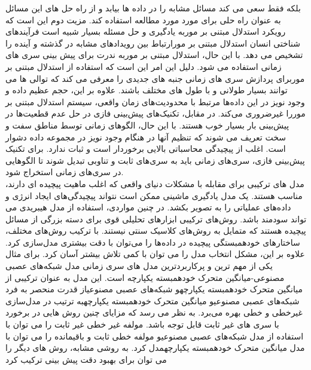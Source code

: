   بلکه فقط سعی می کند مسائل مشابه را در داده ها بیابد 
 و از راه حل های این مسائل
  به عنوان راه حلی برای مورد مورد مطالعه استفاده کند. 
 مزیت دوم این است که رویکرد استدلال مبتنی بر مور\footnotemark[7] به یادگیری و حل مسئله بسیار شبیه است
فرآیندهای شناختی انسان استدلال مبتنی بر مور\footnotemark[7] ارتباط بین رویدادهای مشابه در گذشته و آینده را تشخیص می دهد. با این حال، استدلال مبتنی بر مور\footnotemark[7] به ندرت برای پیش بینی سری های زمانی استفاده می شود.
 دلیل این امر این است که استفاده از استدلال مبتنی بر مور\footnotemark[7] برای پردازش سری های زمانی جنبه های جدیدی را معرفی می کند که توالی ها می توانند بسیار طولانی و با طول های مختلف باشند. 
 علاوه بر این، حجم عظیم داده و وجود نویز در این داده‌ها مرتبط با محدودیت‌های زمان واقعی، سیستم استدلال مبتنی بر مور\footnotemark[7] را غیرضروری می‌کند.
  در مقابل، تکنیک‌های پیش‌بینی فازی در حل عدم قطعیت‌ها در پیش‌بینی بار بسیار خوب هستند.
 با این حال، الگوهای زمانی توسط مناطق سفت و سخت تعریف می شوند که تنظیم آنها در هنگام وجود نویز در مجموعه داده دشوار است. 
 اغلب از پیچیدگی محاسباتی بالایی برخوردار است و ثبات ندارد.
  برای تکنیک پیش‌بینی فازی، سری‌های زمانی باید به سری‌های ثابت و تناوبی تبدیل شوند تا الگوهایی در سری‌های زمانی استخراج شود.
  \\
  مدل های ترکیبی برای مقابله با مشکلات دنیای واقعی که
   اغلب ماهیت پیچیده ای دارند، مناسب هستند. یک مدل یادگیری ماشینی ممکن است نتواند پیچیدگی‌های ایجاد انرژی و داده‌های عملیاتی را به تصویر بکشد.
   در چنین مواردی، استفاده از مدل هیبریدی می تواند سودمند باشد. روش‌های ترکیبی ابزارهای تحلیلی قوی برای دسته بزرگی از مسائل پیچیده هستند
   که متمایل به روش‌های کلاسیک سنتی نیستند. با ترکیب روش‌های مختلف، ساختارهای خودهمبستگی پیچیده در داده‌ها را می‌توان با دقت بیشتری مدل‌سازی کرد. 
  علاوه بر این، مشکل انتخاب مدل را می توان با کمی تلاش بیشتر آسان کرد. برای مثال یکی از مهم ترین و پرکاربردترین مدل های سری زمانی مدل شبکه‌های عصبی مصنوعی-میانگین متحرک خودهمبسته یکپارچه است. این مدل به عنوان ترکیبی 
  از میانگین متحرک خودهمبسته یکپارچه\footnotemark[5] و شبکه‌های عصبی مصنوعی\footnotemark[4] از قدرت منحصر به فرد شبکه‌های عصبی مصنوعی\footnotemark[4] و میانگین متحرک خودهمبسته یکپارچه\footnotemark[5] به ترتیب در مدل‌سازی غیرخطی و خطی بهره می‌برد. به نظر می رسد که مزایای چنین روش هایی در برخورد
   با سری های غیر ثابت قابل توجه باشد. مولفه غیر خطی غیر ثابت را می توان با استفاده از مدل شبکه‌های عصبی مصنوعی\footnotemark[4] و مولفه خطی ثابت
    و باقیمانده را می توان با مدل میانگین متحرک خودهمبسته یکپارچه\footnotemark[5] مدل کرد. به روشی مشابه، روش های دیگر را می توان برای بهبود دقت پیش بینی ترکیب کرد


